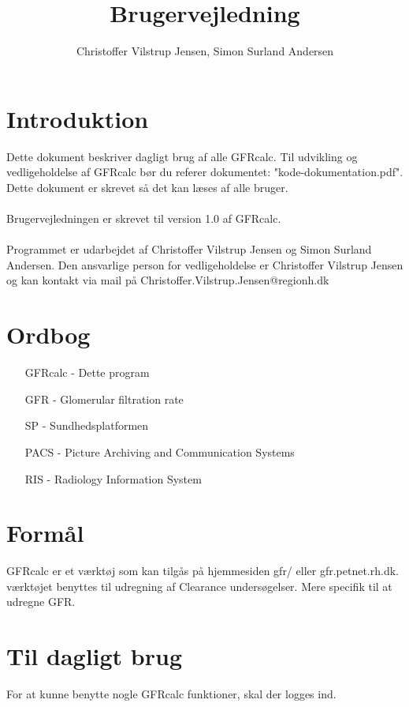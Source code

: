 \documentclass{article}
\author{Christoffer Vilstrup Jensen, Simon Surland Andersen}
\title{Brugervejledning}
\begin{document}
\tableofcontents
\section*{Introduktion}
Dette dokument beskriver dagligt brug af alle GFRcalc. Til udvikling og vedligeholdelse af GFRcalc bør du referer dokumentet: "kode-dokumentation.pdf". Dette dokument er skrevet så det kan læses af alle bruger.\\\\
Brugervejledningen er skrevet til version 1.0 af GFRcalc.\\\\
Programmet er udarbejdet af Christoffer Vilstrup Jensen og Simon Surland Andersen. Den ansvarlige person for vedligeholdelse er Christoffer Vilstrup Jensen og kan kontakt via mail på Christoffer.Vilstrup.Jensen@regionh.dk
\section*{Ordbog}
\begin{itemize}
	\item[GFRcalc] 	- Dette program
	\item[GFR]     	- Glomerular filtration rate
	\item[SP]      	- Sundhedsplatformen
	\item[PACS]	   	- Picture Archiving and Communication Systems
	\item[RIS]		- Radiology Information System
\end{itemize}
\section*{Formål}
GFRcalc er et værktøj som kan tilgås på hjemmesiden gfr/ eller gfr.petnet.rh.dk. værktøjet benyttes til udregning af Clearance undersøgelser. Mere specifik til at udregne GFR. 
\newpage
\section{Til dagligt brug}
For at kunne benytte nogle GFRcalc funktioner, skal der logges ind.  
\end{document}
